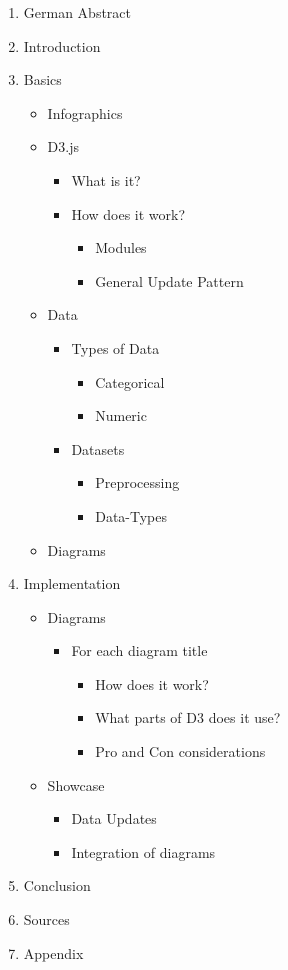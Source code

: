 \documentclass[
a4paper,     %
12pt         %
]{scrartcl}  %
\begin{document}
\begin{enumerate}
  \item German Abstract
  \item Introduction
  \item Basics
  \begin{itemize}
    \item Infographics
    \item D3.js
    \begin{itemize}
      \item What is it?
      \item How does it work?
      \begin{itemize}
        \item Modules
        \item General Update Pattern
      \end{itemize}
    \end{itemize}
    \item Data
    \begin{itemize}
      \item Types of Data
      \begin{itemize}
        \item Categorical
        \item Numeric
      \end{itemize}
      \item Datasets
      \begin{itemize}
        \item Preprocessing
        \item Data-Types
      \end{itemize}
    \end{itemize}
    \item Diagrams
  \end{itemize}
  \item Implementation
  \begin{itemize}
    \item Diagrams
    \begin{itemize}
      \item For each diagram title
      \begin{itemize}
        \item How does it work?
        \item What parts of D3 does it use?
        \item Pro and Con considerations
      \end{itemize}
    \end{itemize}
    \item Showcase
    \begin{itemize}
      \item Data Updates
      \item Integration of diagrams
    \end{itemize}
  \end{itemize}
  \item Conclusion
  \item Sources
  \item Appendix
\end{enumerate}
\end{document}

